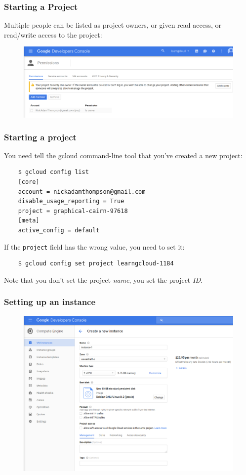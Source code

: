 \documentclass[9pt]{beamer}
\begin{document}
\begin{frame}[fragile]
  \frametitle{Starting a Project}
  Multiple people can be listed as project owners, or given read access, or read/write access to the project:
  \begin{figure}
    \includegraphics[scale=0.2]{figures/AddProjectOwner.png}
  \end{figure}
\end{frame}

\begin{frame}[fragile]
  \frametitle{Starting a project}
  You need tell the gcloud command-line tool that you've created a new project:
  \begin{verbatim}
    $ gcloud config list
    [core]
    account = nickadamthompson@gmail.com
    disable_usage_reporting = True
    project = graphical-cairn-97618 
    [meta]
    active_config = default
  \end{verbatim}
  If the \texttt{project} field has the wrong value, you need to set it:
  \begin{verbatim}
    $ gcloud config set project learngcloud-1184
  \end{verbatim}
  Note that you don't set the project \emph{name}, you set the project \emph{ID}.
\end{frame}


\begin{frame}[fragile]
  \frametitle{Setting up an instance}
  \begin{figure}
    \includegraphics[scale=0.3]{figures/CreateInstance.png}
  \end{figure}
\end{frame}
\end{document}
